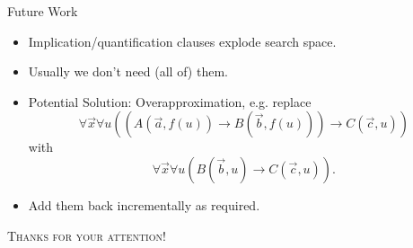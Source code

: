 \documentclass{cubeamer}
\begin{document}
	\begin{frame}{Future Work}
		\begin{itemize}
			\item Implication/quantification clauses explode search space.
			\item Usually we don't need (all of) them.
			\item Potential Solution: Overapproximation, e.g. replace \[\forall\vec x\forall u((A(\vec a, f(u))\to B(\vec b, f(u)))\to C(\vec c, u))\] with \[\forall\vec x\forall u(B(\vec b,u)\to  C(\vec c, u)).\]
			\item Add them back incrementally as required.
		\end{itemize}
	\end{frame}

\begin{frame}[standout]
	\Huge\textsc{Thanks for your attention!}
\end{frame}
	
\end{document}
